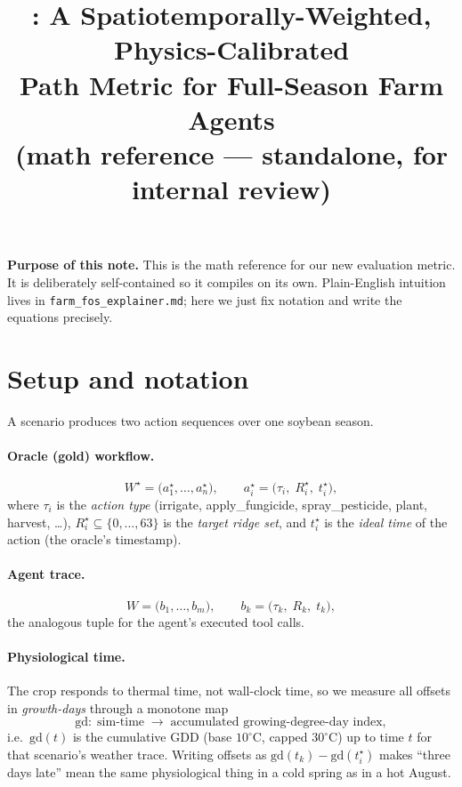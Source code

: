 \documentclass[11pt]{article}
\title{\farmfos: A Spatiotemporally-Weighted, Physics-Calibrated\\
Path Metric for Full-Season Farm Agents \\[4pt]
\large (math reference --- standalone, for internal review)}
\author{}
\date{}
\newcommand{\gd}{\mathrm{gd}}        %
\begin{document}
\maketitle

\noindent\textbf{Purpose of this note.} This is the math reference for our new
evaluation metric. It is deliberately self-contained so it compiles on its own.
Plain-English intuition lives in \texttt{farm\_fos\_explainer.md}; here we just
fix notation and write the equations precisely.

\section{Setup and notation}

A scenario produces two action sequences over one soybean season.

\paragraph{Oracle (gold) workflow.}
\[
W^\star=\bigl(a^\star_1,\dots,a^\star_n\bigr),\qquad
a^\star_i=\bigl(\tau_i,\;R^\star_i,\;t^\star_i\bigr),
\]
where $\tau_i$ is the \emph{action type} (irrigate, apply\_fungicide,
spray\_pesticide, plant, harvest, \dots), $R^\star_i\subseteq\{0,\dots,63\}$ is
the \emph{target ridge set}, and $t^\star_i$ is the \emph{ideal time} of the
action (the oracle's timestamp).

\paragraph{Agent trace.}
\[
W=\bigl(b_1,\dots,b_m\bigr),\qquad b_k=\bigl(\tau_k,\;R_k,\;t_k\bigr),
\]
the analogous tuple for the agent's executed tool calls.

\paragraph{Physiological time.}
The crop responds to thermal time, not wall-clock time, so we measure all
offsets in \emph{growth-days} through a monotone map
\[
\gd:\;\text{sim-time}\;\longrightarrow\;\text{accumulated growing-degree-day index},
\]
i.e.\ $\gd(t)$ is the cumulative GDD (base $10^\circ$C, capped $30^\circ$C) up to
time $t$ for that scenario's weather trace. Writing offsets as
$\gd(t_k)-\gd(t^\star_i)$ makes ``three days late'' mean the same physiological
thing in a cold spring as in a hot August.
\end{document}
